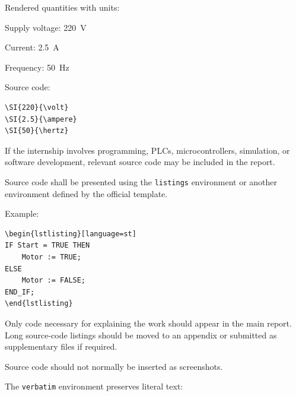 {Rendered quantities with units:

\begin{center}
    Supply voltage: \SI{220}{\volt}\par
    Current: \SI{2.5}{\ampere}\par
    Frequency: \SI{50}{\hertz}
\end{center}

Source code:

\begin{verbatim}
\SI{220}{\volt}
\SI{2.5}{\ampere}
\SI{50}{\hertz}
\end{verbatim}


\vspace{0.3cm}


\noindent
{}

\vspace{0.15cm}

If the internship involves programming, PLCs, microcontrollers,
simulation, or software development, relevant source code may be included
in the report.

Source code shall be presented using the \verb|listings| environment or
another environment defined by the official template.

Example:

\begin{verbatim}
\begin{lstlisting}[language=st]
IF Start = TRUE THEN
    Motor := TRUE;
ELSE
    Motor := FALSE;
END_IF;
\end{lstlisting}
\end{verbatim}

Only code necessary for explaining the work should appear in the main
report. Long source-code listings should be moved to an appendix or
submitted as supplementary files if required.

Source code should not normally be inserted as screenshots.

\vspace{0.3cm}



The \verb|verbatim| environment preserves literal text:

}
